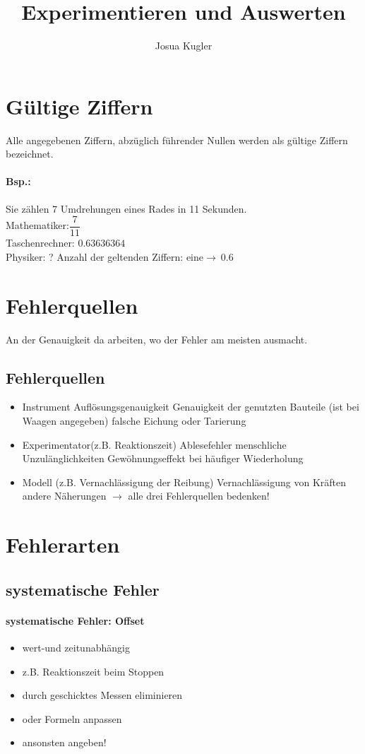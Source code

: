 \documentclass{article}
\title{Experimentieren und Auswerten}
\author{Josua Kugler}
\begin{document}
	\tableofcontents
	\section{Gültige Ziffern}
	Alle angegebenen Ziffern, abzüglich führender Nullen werden als gültige Ziffern bezeichnet.
	\paragraph{Bsp.:} Sie zählen 7 Umdrehungen eines Rades in 11 Sekunden.\\
	Mathematiker:$\dfrac{7}{11}$\\
	Taschenrechner: $0.63636364$\\
	Physiker: ?
	Anzahl der geltenden Ziffern: eine$\to\ 0.6$
	\section{Fehlerquellen}
	An der Genauigkeit da arbeiten, wo der Fehler am meisten ausmacht.
	\subsection{Fehlerquellen}
	\begin{itemize}
		\item Instrument
		\subitem Auflösungsgenauigkeit
		\subitem Genauigkeit der genutzten Bauteile (ist bei Waagen angegeben)
		\subitem falsche Eichung oder Tarierung
		\item Experimentator(z.B. Reaktionszeit)
		\subitem Ablesefehler
		\subitem menschliche Unzulänglichkeiten
		\subitem Gewöhnungseffekt bei häufiger Wiederholung
		\item Modell (z.B. Vernachlässigung der Reibung)
		\subitem Vernachlässigung von Kräften
		\subitem andere Näherungen
		$\to$ alle drei Fehlerquellen bedenken!
	\end{itemize}
	\section{Fehlerarten}
	\subsection{systematische Fehler}
	\paragraph{systematische Fehler: Offset}
	\begin{itemize}
		\item wert-und zeitunabhängig
		\item z.B. Reaktionszeit beim Stoppen
		\item durch geschicktes Messen eliminieren
		\item oder Formeln anpassen
		\item ansonsten angeben!
	\end{itemize}
\end{document}
